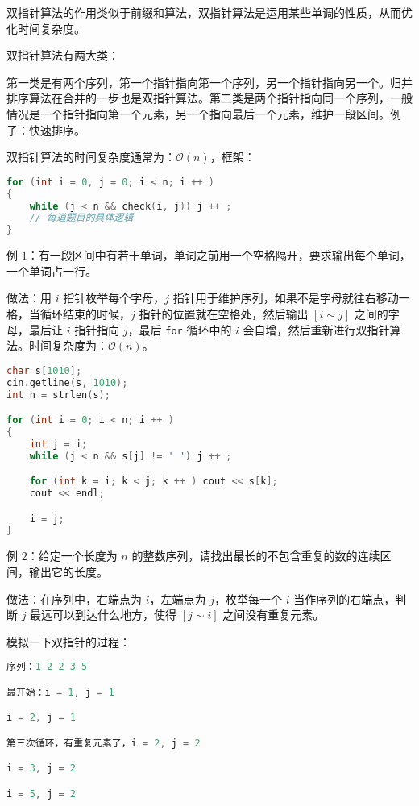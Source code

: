 
双指针算法的作用类似于前缀和算法，双指针算法是运用某些单调的性质，从而优化时间复杂度。

双指针算法有两大类：

第一类是有两个序列，第一个指针指向第一个序列，另一个指针指向另一个。归并排序算法在合并的一步也是双指针算法。第二类是两个指针指向同一个序列，一般情况是一个指针指向第一个元素，另一个指向最后一个元素，维护一段区间。例子：快速排序。

双指针算法的时间复杂度通常为：$\mathcal{O}(n)$，框架：

\begin{lstlisting}[language=cpp]
for (int i = 0, j = 0; i < n; i ++ )
{
    while (j < n && check(i, j)) j ++ ;
    // 每道题目的具体逻辑
}
\end{lstlisting}

例 $1$：有一段区间中有若干单词，单词之前用一个空格隔开，要求输出每个单词，一个单词占一行。

做法：用 $i$ 指针枚举每个字母，$j$ 指针用于维护序列，如果不是字母就往右移动一格，当循环结束的时候，$j$ 指针的位置就在空格处，然后输出 $[i \sim j]$ 之间的字母，最后让 $i$ 指针指向 $j$，最后 \verb|for| 循环中的 $i$ 会自增，然后重新进行双指针算法。时间复杂度为：$\mathcal{O}(n)$。

\begin{lstlisting}[language=cpp]
char s[1010];
cin.getline(s, 1010);
int n = strlen(s);

for (int i = 0; i < n; i ++ )
{
    int j = i;
    while (j < n && s[j] != ' ') j ++ ;

    for (int k = i; k < j; k ++ ) cout << s[k];
    cout << endl;

    i = j;
}
\end{lstlisting}



例 $2$：给定一个长度为 $n$ 的整数序列，请找出最长的不包含重复的数的连续区间，输出它的长度。

做法：在序列中，右端点为 $i$，左端点为 $j$，枚举每一个 $i$ 当作序列的右端点，判断 $j$ 最远可以到达什么地方，使得 $[j \sim i]$ 之间没有重复元素。

模拟一下双指针的过程：

\begin{lstlisting}[language=cpp]
序列：1 2 2 3 5

最开始：i = 1, j = 1

i = 2, j = 1

第三次循环，有重复元素了，i = 2, j = 2

i = 3, j = 2

i = 5, j = 2
\end{lstlisting}

